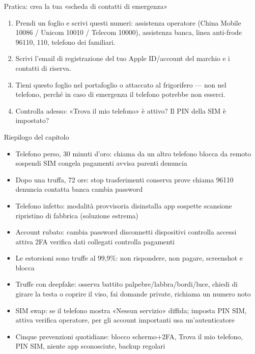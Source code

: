 \begin{tcbpractice}{Pratica: crea la tua «scheda di contatti di emergenza»}
\begin{enumerate}
  \item Prendi un foglio e scrivi questi numeri: assistenza operatore (China Mobile 10086 / Unicom 10010 / Telecom 10000), assistenza banca, linea anti-frode 96110, 110, telefono dei familiari.
  \item Scrivi l'email di registrazione del tuo Apple ID/account del marchio e i contatti di riserva.
  \item Tieni questo foglio nel portafoglio o attaccato al frigorifero — non nel telefono, perché in caso di emergenza il telefono potrebbe non esserci.
  \item Controlla adesso: «Trova il mio telefono» è attivo? Il PIN della SIM è impostato?
\end{enumerate}

\end{tcbpractice}

\begin{tcbsummary}{Riepilogo del capitolo}
\begin{itemize}
  \item Telefono perso, 30 minuti d'oro: chiama da un altro telefono blocca da remoto sospendi SIM congela pagamenti avvisa parenti denuncia
  \item Dopo una truffa, 72 ore: stop trasferimenti conserva prove chiama 96110 denuncia contatta banca cambia password
  \item Telefono infetto: modalità provvisoria disinstalla app sospette scansione ripristino di fabbrica (soluzione estrema)
  \item Account rubato: cambia password disconnetti dispositivi controlla accessi attiva 2FA verifica dati collegati controlla pagamenti
  \item Le estorsioni sono truffe al 99,9\%: non rispondere, non pagare, screenshot e blocca
  \item Truffe con deepfake: osserva battito palpebre/labbra/bordi/luce, chiedi di girare la testa o coprire il viso, fai domande private, richiama un numero noto
  \item SIM swap: se il telefono mostra «Nessun servizio» diffida; imposta PIN SIM, attiva verifica operatore, per gli account importanti usa un'autenticatore
  \item Cinque prevenzioni quotidiane: blocco schermo+2FA, Trova il mio telefono, PIN SIM, niente app sconosciute, backup regolari
\end{itemize}

\end{tcbsummary}
